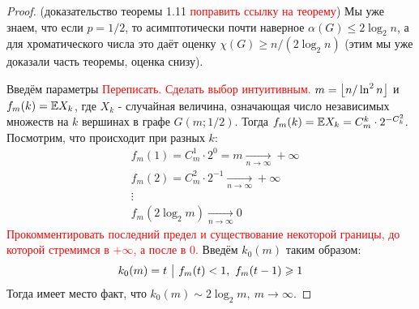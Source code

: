 \begin{proof} (доказательство теоремы 1.11 \textcolor{red}{поправить ссылку на теорему})
	Мы уже знаем, что если $p = 1 / 2$, то асимптотически почти наверное $\alpha(G) \le 2\log_2 n$, а для хроматического числа это даёт оценку $\chi(G) \ge n / (2\log_2 n)$ (этим мы уже доказали часть теоремы, оценка снизу).
	
	Введём параметры \textcolor{red}{Переписать. Сделать выбор интуитивным.} $m = \left\lfloor n / \ln^2 n \right\rfloor$ и $f_m(k) = \mathbb{E} X_k$, где $X_k$ - случайная величина, означающая число независимых множеств на $k$ вершинах в графе $G(m; 1 / 2)$. Тогда $f_m(k) = \mathbb{E} X_k = C_m^k \cdot 2^{-C_k^2}$. Посмотрим, что происходит при разных $k$:
	\begin{align*}
		&{f_m(1) = C_m^1 \cdot 2^0 = m \xrightarrow[n \to \infty]{} +\infty}
		\\
		&{f_m(2) = C_m^2 \cdot 2^{-1} \xrightarrow[n \to \infty]{} +\infty}
		\\
		&{\vdots}
		\\
		&{f_m(2\log_2 m) \xrightarrow[n \to \infty]{} 0}
	\end{align*}
	\textcolor{red}{Прокомментировать последний предел и существование некоторой границы, до которой стремимся в $+\infty$, а после в 0.} Введём $k_0(m)$ таким образом:
	\[
		k_0(m) = t \ \big|\  f_m(t) < 1,\ f_m(t - 1) \geqslant 1
	\]
	Тогда имеет место факт, что $k_0(m) \sim 2\log_2 m,\ m \to \infty$.
\end{proof}

